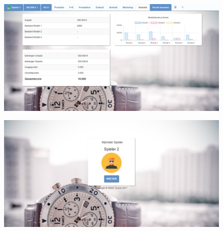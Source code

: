 \begin{figure} 
	\centering
	\includegraphics[scale=0.1]{img/bilder_layout/MockUp5.jpg} 
\end{figure}
\begin{figure} 
	\centering
	\includegraphics[scale=0.1]{img/bilder_layout/MockUp8.jpg} 
\end{figure}

\clearpage
